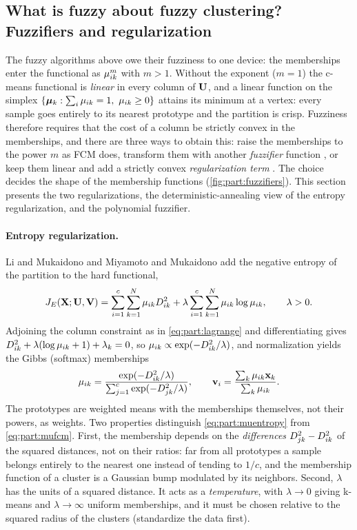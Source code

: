\subsection{What is fuzzy about fuzzy clustering? Fuzzifiers and regularization}\label{sec:part:fuzzifiers}

The fuzzy algorithms above owe their fuzziness to one device: the memberships enter the functional as $\mu_{ik}^m$ with $m>1$. Without the exponent ($m=1$) the c-means functional is \emph{linear} in every column of $\mathbf{U}$, and a linear function on the simplex $\{\boldsymbol\mu_k:\sum_i\mik=1,\ \mik\ge0\}$ attains its minimum at a vertex: every sample goes entirely to its nearest prototype and the partition is crisp. Fuzziness therefore requires that the cost of a column be strictly convex in the memberships, and there are three ways to obtain this: raise the memberships to the power $m$ as FCM does, transform them with another \emph{fuzzifier} function \cite{klawonn:2003:fuzzifier}, or keep them linear and add a strictly convex \emph{regularization term} \cite{miyamoto:1997:entropy}. The choice decides the shape of the membership functions (\cref{fig:part:fuzzifiers}). This section presents the two regularizations, the deterministic-annealing view of the entropy regularization, and the polynomial fuzzifier.

\paragraph{Entropy regularization.} Li and Mukaidono \cite{li:1995:entropy} and Miyamoto and Mukaidono \cite{miyamoto:1997:entropy} add the negative entropy of the partition to the hard functional,
\begin{equation}
  J_E(\mathbf{X};\mathbf{U},\mathbf{V})=\sum_{i=1}^{c}\sum_{k=1}^{N}\mu_{ik}D^2_{ik}+\lambda\sum_{i=1}^{c}\sum_{k=1}^{N}\mu_{ik}\log\mu_{ik},\qquad\lambda>0 .
  \label{eq:part:Jentropy}
\end{equation}
Adjoining the column constraint as in \eqref{eq:part:lagrange} and differentiating gives $D^2_{ik}+\lambda(\log\mu_{ik}+1)+\lambda_k=0$, so $\mu_{ik}\propto\exp(-D^2_{ik}/\lambda)$, and normalization yields the Gibbs (softmax) memberships
\begin{equation}
  \mu_{ik}=\frac{\exp(-D^2_{ik}/\lambda)}{\sum_{j=1}^{c}\exp(-D^2_{jk}/\lambda)},\qquad
  \mathbf{v}_i=\frac{\sum_{k}\mu_{ik}\mathbf{x}_k}{\sum_{k}\mu_{ik}}.
  \label{eq:part:muentropy}
\end{equation}
The prototypes are weighted means with the memberships themselves, not their powers, as weights. Two properties distinguish \eqref{eq:part:muentropy} from \eqref{eq:part:mufcm}. First, the membership depends on the \emph{differences} $D^2_{jk}-D^2_{ik}$ of the squared distances, not on their ratios: far from all prototypes a sample belongs entirely to the nearest one instead of tending to $1/c$, and the membership function of a cluster is a Gaussian bump modulated by its neighbors. Second, $\lambda$ has the units of a squared distance. It acts as a \emph{temperature}, with $\lambda\to0$ giving k-means and $\lambda\to\infty$ uniform memberships, and it must be chosen relative to the squared radius of the clusters (standardize the data first).

